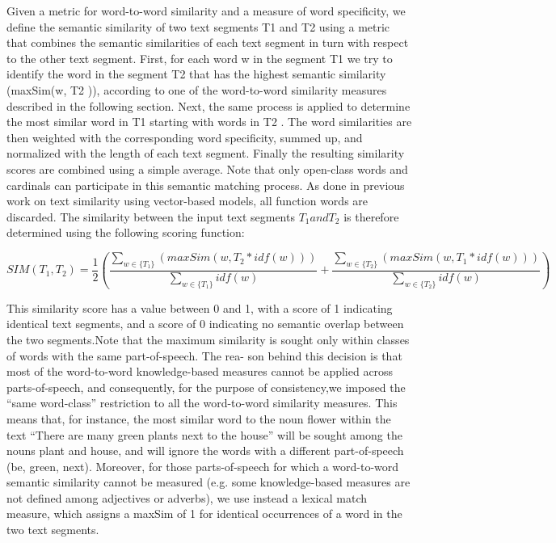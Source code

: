    Given a metric for word-to-word similarity and a measure of word specificity, we define the semantic similarity of two text segments T1 and T2 using a metric that combines the semantic similarities of each text segment in turn with respect to the other text segment. First, for each word w in the segment T1 we try to identify the word in the segment T2 that has the highest semantic similarity (maxSim(w, T2 )), according to one of the word-to-word similarity measures described in the following section. Next, the same process is applied to determine the most similar word in T1 starting with words in T2 . The word similarities are then weighted with the corresponding word specificity, summed up, and normalized with the length of each text segment. Finally the resulting similarity scores are combined using a simple average. Note that only open-class words and cardinals can participate in this semantic matching process. As done in previous work on text similarity using vector-based models, all function words are discarded.
    The similarity between the input text segments $T_1 and T_2$ is therefore determined using the following scoring function:
    
\begin{equation}
SIM({T_{1}},{T_{2}}) =\frac{1}{2}(\frac{\sum_{w\in \{T_1\}} (maxSim(w,T_2 * idf(w)))}{\sum_{w\in \{T_1\}} idf(w)} + \frac{\sum_{w\in \{T_2\}} (maxSim(w,T_1 * idf(w)))}{\sum_{w\in \{T_2\}} idf(w)})
\end{equation}

   This similarity score has a value between 0 and 1, with a score of 1 indicating identical text segments, and a score of 0 indicating no semantic overlap between the two segments.Note that the maximum similarity is sought only within classes of words with the same part-of-speech. The rea-
son behind this decision is that most of the word-to-word knowledge-based measures cannot be applied across parts-of-speech, and consequently, for the purpose of consistency,we imposed the “same word-class” restriction to all the word-to-word similarity measures. This means that, for instance, the most similar word to the noun flower within the text “There are many green plants next to the house” will be sought among the nouns plant and house, and will ignore the words with a different part-of-speech (be, green, next). Moreover, for those parts-of-speech for which a word-to-word semantic similarity cannot be measured (e.g. some knowledge-based measures are not defined among adjectives or adverbs), we use instead a lexical match measure,
which assigns a maxSim of 1 for identical occurrences of a word in the two text segments.



